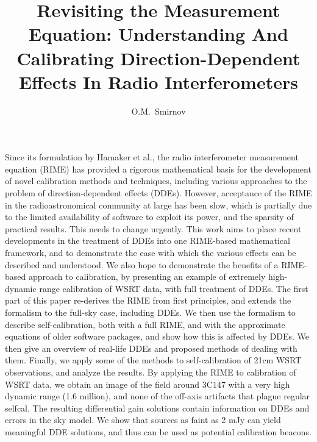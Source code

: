 \documentclass[]{aa}
\begin{document}
\title{Revisiting the Measurement Equation: Understanding And Calibrating Direction-Dependent Effects  In Radio Interferometers}

\author{O.M.\ Smirnov}


\date{}


\abstract%
{Since its formulation by Hamaker et al., the radio interferometer measurement equation (RIME) 
has provided a rigorous mathematical basis for the development of novel calibration methods and 
techniques, including various approaches to the problem of direction-dependent effects (DDEs). 
However, acceptance of the RIME in the radioastronomical community at large has been slow, which is
partially due to the limited availability of software to exploit its power, and the sparsity of 
practical results. This needs to change urgently.}
{This work aims to place recent developments in the treatment of DDEs into one RIME-based mathematical 
framework, and to demonstrate the ease with which the various effects can be described and understood. 
We also hope to demonstrate the benefits of a RIME-based approach to calibration, by presenting 
an example of extremely high-dynamic range calibration of WSRT data, with full treatment of DDEs. 
}
{The first part of this paper re-derives the RIME from first principles, and extends the formalism to
the full-sky case, including DDEs. We then use the formalism to describe self-calibration, both with 
a full RIME, and with the approximate equations of older software packages, and show how this is affected 
by DDEs. We then give an overview of real-life DDEs and proposed methods of dealing with them. Finally, we 
apply some of the methods to self-calibration of 21cm WSRT observations, and analyze the results.
}%
{By applying the RIME to calibration of WSRT data, we obtain an image of the field around 3C147 with a very high dynamic 
range (1.6 million), and none of the off-axis artifacts that plague regular selfcal. The resulting differential gain solutions contain information on DDEs and errors in the sky model. We show that sources as faint as 2 mJy can yield
meaningful DDE solutions, and thus can be used as potential calibration beacons. 
}%
{}
\end{document}
